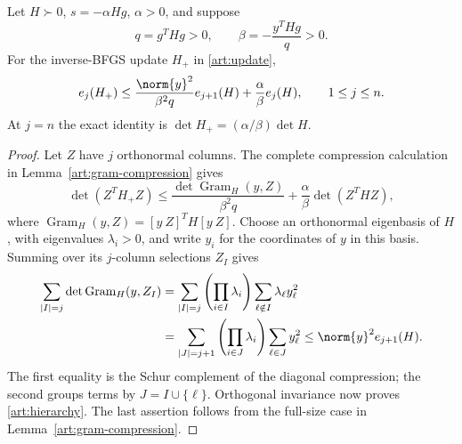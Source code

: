 \begin{theorem}\label{art:minor-hierarchy}
Let $H\succ0$, $s=-\alpha Hg$, $\alpha>0$, and suppose
\[
 q=g^THg>0,\qquad \beta=-\frac{y^THg}{q}>0.
\]
For the inverse-BFGS update $H_+$ in \eqref{art:update},
\begin{equation}\label{art:hierarchy}
 e_j(H_+)\le\frac{\norm{y}^2}{\beta^2q}e_{j+1}(H)
                   +\frac\alpha\beta e_j(H),\qquad 1\le j\le n.
\end{equation}
At $j=n$ the exact identity is $\det H_+=(\alpha/\beta)\det H$.
\end{theorem}
\begin{proof}
Let $Z$ have $j$ orthonormal columns. The complete compression calculation in
Lemma~\ref{art:gram-compression} gives
\[
 \det(Z^TH_+Z)\le
 \frac{\det\operatorname{Gram}_H(y,Z)}{\beta^2q}
       +\frac\alpha\beta\det(Z^THZ),
\]
where $\operatorname{Gram}_H(y,Z)=[y\ Z]^TH[y\ Z]$.
Choose an orthonormal eigenbasis of $H$, with eigenvalues $\lambda_i>0$, and
write $y_i$ for the coordinates of $y$ in this basis. Summing over its
$j$-column selections $Z_I$ gives
\begin{align*}
 \sum_{|I|=j}\det\operatorname{Gram}_H(y,Z_I)
 &=\sum_{|I|=j}\left(\prod_{i\in I}\lambda_i\right)
                  \sum_{\ell\notin I}\lambda_\ell y_\ell^2\\
 &=\sum_{|J|=j+1}\left(\prod_{i\in J}\lambda_i\right)
                  \sum_{\ell\in J}y_\ell^2
 \le\norm{y}^2e_{j+1}(H).
\end{align*}
The first equality is the Schur complement of the diagonal compression;
the second groups terms by $J=I\cup\{\ell\}$. Orthogonal invariance now
proves \eqref{art:hierarchy}. The last assertion follows from the full-size
case in Lemma~\ref{art:gram-compression}.
\end{proof}

